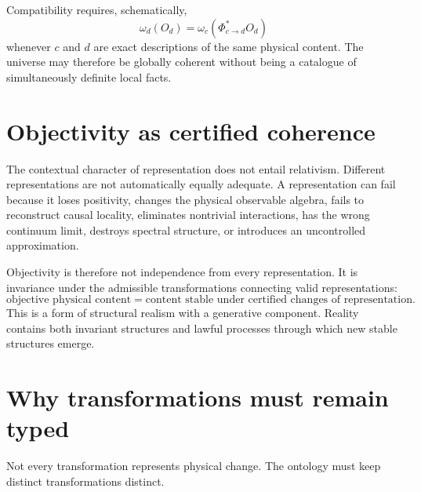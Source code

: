 \documentclass[11pt]{article}
\begin{document}
Compatibility requires, schematically,
\begin{equation}
  \omega_d(O_d)
  =
  \omega_c\!\left(\Phi_{c\to d}^{*}O_d\right)
  \label{eq:state-compatibility}
\end{equation}
whenever $c$ and $d$ are exact descriptions of the same physical content.  The
universe may therefore be globally coherent without being a catalogue of
simultaneously definite local facts.

\section{Objectivity as certified coherence}

The contextual character of representation does not entail relativism.
Different representations are not automatically equally adequate.  A
representation can fail because it loses positivity, changes the physical
observable algebra, fails to reconstruct causal locality, eliminates
nontrivial interactions, has the wrong continuum limit, destroys spectral
structure, or introduces an uncontrolled approximation.

Objectivity is therefore not independence from every representation.  It is
invariance under the admissible transformations connecting valid
representations:
\begin{equation}
\boxed{
  \text{objective physical content}
  =
  \text{content stable under certified changes of representation}.}
  \label{eq:objectivity}
\end{equation}
This is a form of structural realism with a generative component.  Reality
contains both invariant structures and lawful processes through which new
stable structures emerge.

\section{Why transformations must remain typed}

Not every transformation represents physical change.  The ontology must keep
distinct transformations distinct.
\end{document}
